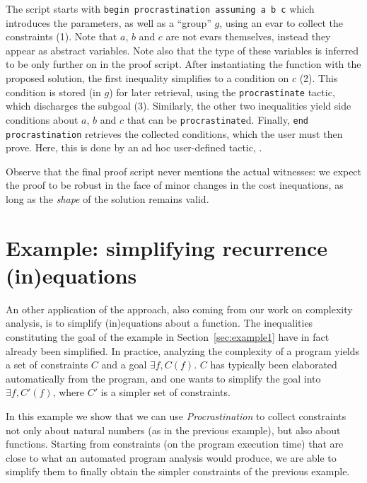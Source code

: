 \documentclass[xetex,format=acmlarge,screen=true,authorversion=true]{acmart-modified}
\begin{document}
\vspace{0.5em}



\vspace{0.5em}

The script starts with \texttt{begin procrastination assuming a b c} which
introduces the parameters, as well as a ``group'' $g$, using an evar to collect
the constraints (1). Note that $a$, $b$ and $c$ are not evars themselves,
instead they appear as abstract variables. Note also that
the type of these variables
%
is inferred to be  only further on in the proof script. After
instantiating the function with the proposed solution, the first inequality
simplifies to a condition on $c$ (2). This condition is stored (in $g$) for
later retrieval, using the \texttt{procrastinate} tactic, which discharges the
subgoal (3). Similarly, the other two inequalities yield side conditions about
$a$, $b$ and $c$ that can be \texttt{procrastinate}d. Finally, \texttt{end
  procrastination} retrieves the collected conditions, which the user must then
prove. Here, this is done by an ad hoc user-defined tactic, .

Observe that the final proof script never mentions the actual witnesses: we
expect the proof to be robust in the face of minor changes in the cost
inequations, as long as the \emph{shape} of the solution remains valid.

\section{Example: simplifying recurrence (in)equations}

An other application of the approach, also coming from our work on complexity
analysis, is to simplify (in)equations about a function. The inequalities
constituting the goal of the example in Section~\ref{sec:example1} have in fact
already been simplified. In practice, analyzing the complexity of a program
yields a set of constraints $C$ and a goal $\exists f, C(f)$. $C$ has typically
been elaborated automatically from the program, and one wants to simplify the
goal into $\exists f, C'(f)$, where $C'$ is a simpler set of constraints.

In this example we show that we can use \emph{Procrastination} to collect
constraints not only about natural numbers (as in the previous example), but
also about functions. Starting from constraints (on the program execution time)
that are close to what an automated program analysis would produce, we are able
to simplify them to finally obtain the simpler constraints of the previous
example.
\end{document}
